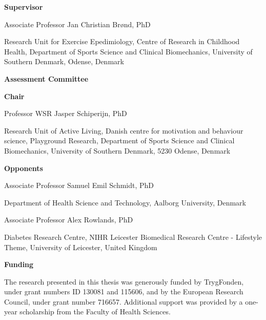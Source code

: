 \documentclass[
  9pt,
]{article}
\author{}
\date{}
\begin{document}
  
  



\newpage

\textsf{\textbf{\Large{Supervisor}}}

\vspace*{\baselineskip}

Associate Professor Jan Christian Brønd, PhD

Research Unit for Exercise Epedimiology, Centre of Research in Childhood Health, Department of Sports Science and Clinical Biomechanics, University of Southern Denmark, Odense, Denmark

\vspace{2cm}

\textsf{\textbf{\Large{Assessment Committee}}}

\vspace*{\baselineskip}

\textbf{Chair}

Professor WSR Jasper Schiperijn, PhD

Research Unit of Active Living, Danish centre for motivation and behaviour science, Playground Research, Department of Sports Science and Clinical Biomechanics, University of Southern Denmark, 5230 Odense, Denmark

\textbf{Opponents}

Associate Professor Samuel Emil Schmidt, PhD

Department of Health Science and Technology, Aalborg University, Denmark

Associate Professor Alex Rowlands, PhD

Diabetes Research Centre, NIHR Leicester Biomedical Research Centre - Lifestyle Theme, University of Leicester, United Kingdom

\vspace{2cm}

\textsf{\textbf{\Large{Funding}}}

\vspace*{\baselineskip}

The research presented in this thesis was generously funded by TrygFonden, under grant numbers ID 130081 and 115606, and by the European Research Council, under grant number 716657. Additional support was provided by a one-year scholarship from the Faculty of Health Sciences.

\newpage

  
\end{document}
